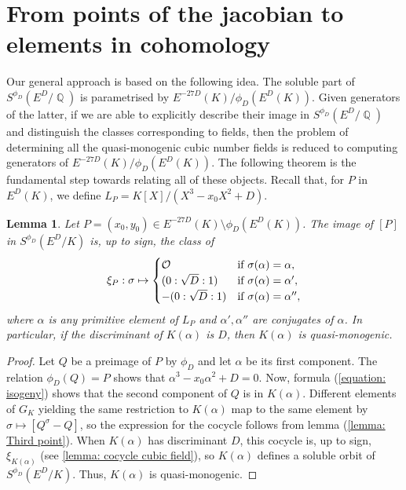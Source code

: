 \documentclass[oneside]{amsart}
\DeclareMathOperator{\QQ}{\mathbb{Q}}
\newtheorem{lemma}[X]{Lemma}
\theoremstyle{definition}
\begin{document}
\section{From points of the jacobian to elements in cohomology}
\label{section: from points to orbits}
Our general approach is based on the following idea. The soluble part of $S^{\phi_D}(E^D/\QQ)$ is parametrised by $E^{-27D}(K)/\phi_D(E^D(K))$. Given generators of the latter, if we are able to explicitly describe their image in $S^{\phi_D}(E^D/\QQ)$ and distinguish the classes corresponding to fields, then the problem of determining all the quasi-monogenic cubic number fields is reduced to computing generators of $E^{-27D}(K)/\phi_D(E^D(K))$. The following theorem is the fundamental step towards relating all of these objects. Recall that, for $P$ in $E^D(K)$, we define $L_P = K[X]/(X^3 -x_0X^2 + D).$ 
\begin{lemma}
    \label{lemma: explicit cocycle}
    Let $P = (x_0,y_0) \in E^{-27D}(K) \setminus \phi_D(E^D(K))$. The image of $[P]$ in $S^{\phi_D}(E^D/K)$ is, up to sign, the class of
    $$
    \xi_P:\sigma \mapsto
    \begin{cases}
        \mathcal{O}&\textnormal{if }\sigma(\alpha) = \alpha,\\
        (0:\sqrt{D}:1)&\textnormal{if }\sigma(\alpha) = \alpha',\\
        -(0:\sqrt{D}:1)&\textnormal{if }\sigma(\alpha) = \alpha'',\\
    \end{cases}
    $$
    where $\alpha$ is any primitive element of $L_P$ and $\alpha', \alpha''$ are conjugates of $\alpha$. In particular, if the discriminant of $K(\alpha)$ is $D$, then $K(\alpha)$ is quasi-monogenic.
\end{lemma}
\begin{proof}
    Let $Q$ be a preimage of $P$ by $\phi_D$ and let $\alpha$ be its first component. The relation $\phi_D(Q) = P$ shows that $\alpha^3 - x_0\alpha^2 + D = 0$. Now, formula (\ref{equation: isogeny}) shows that the second component of $Q$ is in $K(\alpha)$. Different elements of $G_{K}$ yielding the same restriction to $K(\alpha)$ map to the same element by $\sigma \mapsto [Q^{\sigma} - Q]$, so the expression for the cocycle follows from lemma (\ref{lemma: Third point}). When $K(\alpha)$ has discriminant $D$, this cocycle is, up to sign, $\xi_{K(\alpha)}$ (see \ref{lemma: cocycle cubic field}), so $K(\alpha)$ defines a soluble orbit of $S^{\phi_D}(E^D/K)$. Thus, $K(\alpha)$ is quasi-monogenic.
\end{proof}
\end{document}
